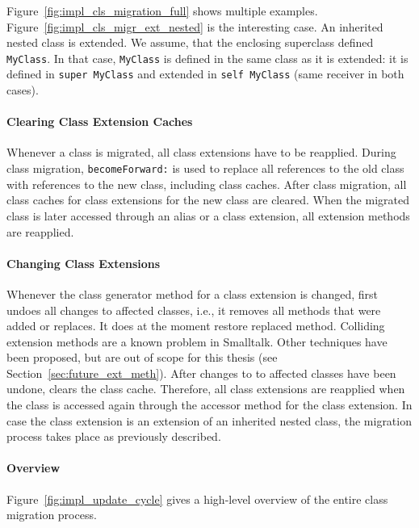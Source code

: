 Figure~\ref{fig:impl_cls_migration_full} shows multiple examples. Figure~\ref{fig:impl_cls_migr_ext_nested} is the interesting case. An inherited nested class is extended. We assume, that the enclosing superclass defined \texttt{MyClass}. In that case, \texttt{MyClass} is defined in the same class as it is extended: it is defined in \texttt{super MyClass} and extended in \texttt{self MyClass} (same receiver in both cases).

\paragraph{Clearing Class Extension Caches}
Whenever a class is migrated, all class extensions have to be reapplied. During class migration, \texttt{becomeForward:} is used to replace all references to the old class with references to the new class, including class caches. After class migration, all class caches for class extensions for the new class are cleared. When the migrated class is later accessed through an alias or a class extension, all extension methods are reapplied.

\paragraph{Changing Class Extensions}
Whenever the class generator method for a class extension is changed, \msname first undoes all changes to affected classes, i.e., it removes all methods that were added or replaces. It does at the moment restore replaced method. Colliding extension methods are a known problem in Smalltalk. Other techniques have been proposed, but are out of scope for this thesis (see Section~\ref{sec:future_ext_meth}). After changes to to affected classes have been undone, \msname clears the class cache. Therefore, all class extensions are reapplied when the class is accessed again through the accessor method for the class extension. In case the class extension is an extension of an inherited nested class, the migration process takes place as previously described.

\paragraph{Overview}
Figure~\ref{fig:impl_update_cycle} gives a high-level overview of the entire class migration process.

